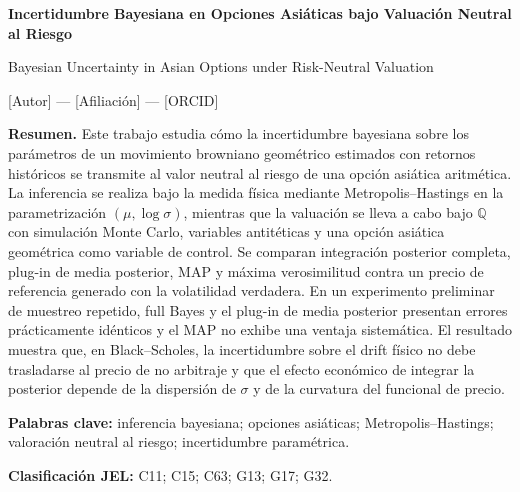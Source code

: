 \documentclass[12pt,letterpaper]{article}
\newif\ifblind
\begin{document}

\begin{center}
{\Large\bfseries Incertidumbre Bayesiana en Opciones Asiáticas bajo Valuación Neutral al Riesgo\par}
\vspace{0.3cm}
{\large Bayesian Uncertainty in Asian Options under Risk-Neutral Valuation\par}
\vspace{0.55cm}
\ifblind
{\normalsize Manuscrito anónimo para revisión por pares\par}
\else
{\normalsize [Autor] --- [Afiliación] --- [ORCID]\par}
\fi
\end{center}

\vspace{0.45cm}

\textbf{Resumen.} Este trabajo estudia cómo la incertidumbre bayesiana sobre los parámetros de un movimiento browniano geométrico estimados con retornos históricos se transmite al valor neutral al riesgo de una opción asiática aritmética. La inferencia se realiza bajo la medida física mediante Metropolis--Hastings en la parametrización $(\mu,\log\sigma)$, mientras que la valuación se lleva a cabo bajo $\mathbb Q$ con simulación Monte Carlo, variables antitéticas y una opción asiática geométrica como variable de control. Se comparan integración posterior completa, plug-in de media posterior, MAP y máxima verosimilitud contra un precio de referencia generado con la volatilidad verdadera. En un experimento preliminar de muestreo repetido, full Bayes y el plug-in de media posterior presentan errores prácticamente idénticos y el MAP no exhibe una ventaja sistemática. El resultado muestra que, en Black--Scholes, la incertidumbre sobre el drift físico no debe trasladarse al precio de no arbitraje y que el efecto económico de integrar la posterior depende de la dispersión de $\sigma$ y de la curvatura del funcional de precio.

\textbf{Palabras clave:} inferencia bayesiana; opciones asiáticas; Metropolis--Hastings; valoración neutral al riesgo; incertidumbre paramétrica.

\textbf{Clasificación JEL:} C11; C15; C63; G13; G17; G32.

\vspace{0.35cm}
\end{document}
